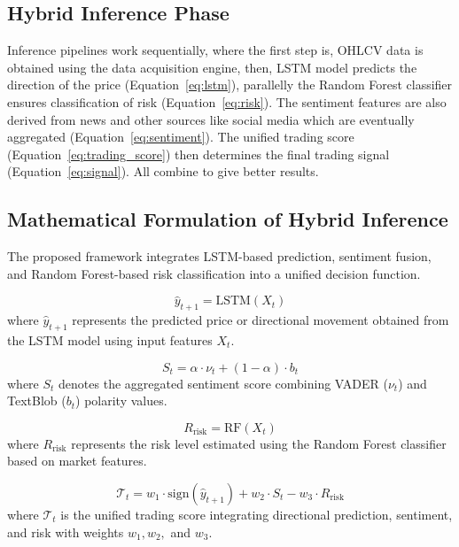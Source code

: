 \documentclass[twocolumn]{article}
\begin{document}
\subsection{Hybrid Inference Phase}

Inference pipelines work sequentially, where the first step is, OHLCV data is obtained using the data acquisition engine, then, LSTM model predicts the direction of the price (Equation~\eqref{eq:lstm}), parallelly the Random Forest classifier ensures classification of risk (Equation~\eqref{eq:risk}). The sentiment features are also derived from news and other sources like social media which are eventually aggregated (Equation~\eqref{eq:sentiment}). The unified trading score (Equation~\eqref{eq:trading_score}) then determines the final trading signal (Equation~\eqref{eq:signal}). All combine to give better results.

\subsection{Mathematical Formulation of Hybrid Inference}

The proposed framework integrates LSTM-based prediction, sentiment fusion, and Random Forest-based risk classification into a unified decision function.

\begin{equation}
\hat{y}_{t+1} = \text{LSTM}(X_t)
\label{eq:lstm}
\end{equation}
where $\hat{y}_{t+1}$ represents the predicted price or directional movement obtained from the LSTM model using input features $X_t$.

\begin{equation}
S_t = \alpha \cdot \nu_t + (1-\alpha)\cdot b_t
\label{eq:sentiment}
\end{equation}
where $S_t$ denotes the aggregated sentiment score combining VADER ($\nu_t$) and TextBlob ($b_t$) polarity values.

\begin{equation}
R_{\text{risk}} = \text{RF}(X_t)
\label{eq:risk}
\end{equation}
where $R_{\text{risk}}$ represents the risk level estimated using the Random Forest classifier based on market features.

\begin{equation}
\mathcal{T}_t = w_1 \cdot \text{sign}(\hat{y}_{t+1}) + w_2 \cdot S_t - w_3 \cdot R_{\text{risk}}
\label{eq:trading_score}
\end{equation}
where $\mathcal{T}_t$ is the unified trading score integrating directional prediction, sentiment, and risk with weights $w_1, w_2,$ and $w_3$.
\end{document}
